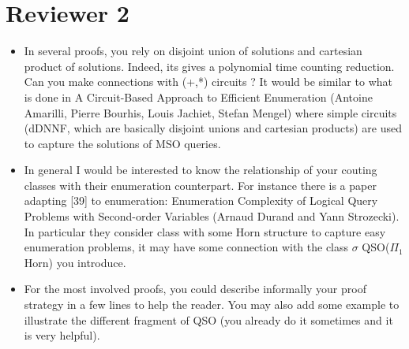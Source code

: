\documentclass[a4paper]{article}
\begin{document}
\bigskip

\section*{Reviewer 2}

\begin{itemize}
	\setlength\itemsep{0.5em}
	\item In several proofs, you rely on disjoint union of solutions and cartesian product of solutions. Indeed, its gives a polynomial time counting reduction. Can you make connections with (+,*) circuits ? It would be similar to what is done in A Circuit-Based Approach to Efficient Enumeration (Antoine Amarilli, Pierre Bourhis, Louis Jachiet, Stefan Mengel) where simple circuits (dDNNF, which are basically disjoint unions and cartesian products) are used to capture the solutions of MSO queries.
	
	\item In general I would be interested to know the relationship of your couting classes with their enumeration counterpart. 
	For instance there is a paper adapting [39] to enumeration: Enumeration Complexity of Logical Query Problems with Second-order Variables (Arnaud Durand and Yann Strozecki). In particular they consider class with some Horn structure to capture easy enumeration problems, it may have some connection with the class $\sigma$ QSO($\Pi_1$ Horn) you introduce.
	
	\item For the most involved proofs, you could describe informally your proof strategy in a few lines to help the reader. You may also add some example to illustrate the different fragment of QSO (you already do it sometimes and it is very helpful).
	

\end{itemize}
\end{document}
